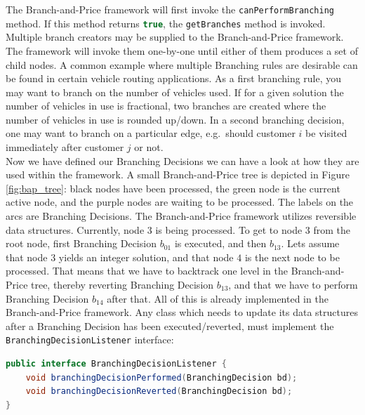 \documentclass[a4paper]{article}
\newenvironment{myblock}[1]{%
    \tcolorbox[beamer,%
    noparskip,breakable,
    colback=lightBlueCodeBlock,colframe=darkBlueCodeBlock,%
    colbacklower=darkBlueCodeBlock!75!lightBlueCodeBlock,%
    coltitle=blueTitleCodeBlock,
    title=#1]}%
    {\endtcolorbox}
\newcommand{\code}[1]{\lstinline[language=java, style=seminar]!#1!}
\begin{document}
The Branch-and-Price framework will first invoke the \code{canPerformBranching} method. If this method returns \code{true}, the \code{getBranches} method is invoked. Multiple branch creators may be supplied to the Branch-and-Price framework. The framework will invoke them one-by-one until either of them produces a set of child nodes. A common example where multiple Branching rules are desirable can be found in certain vehicle routing applications. As a first branching rule, you may want to branch on the number of vehicles used. If for a given solution the number of vehicles in use is fractional, two branches are created where the number of vehicles in use is rounded up/down. In a second branching decision, one may want to branch on a particular edge, e.g.\ should customer $i$ be visited immediately after customer $j$ or not.\\
Now we have defined our Branching Decisions we can have a look at how they are used within the framework. A small Branch-and-Price tree is depicted in Figure \ref{fig:bap_tree}: black nodes have been processed, the green node is the current active node, and the purple nodes are waiting to be processed. The labels on the arcs are Branching Decisions. The Branch-and-Price framework utilizes reversible data structures. Currently, node $3$ is being processed. To get to node $3$ from the root node, first Branching Decision $b_{01}$ is executed, and then $b_{13}$. Lets assume that node $3$ yields an integer solution, and that node $4$ is the next node to be processed. That means that we have to backtrack one level in the Branch-and-Price tree, thereby reverting Branching Decision $b_{13}$, and that we have to perform Branching Decision $b_{14}$ after that. All of this is already implemented in the Branch-and-Price framework. Any class which needs to update its data structures after a Branching Decision has been executed/reverted, must implement the \code{BranchingDecisionListener} interface:
\begin{myblock}{BranchingDecisionListener}
\begin{lstlisting}[language=java, style=eclipseArticle, xleftmargin=2em]  
public interface BranchingDecisionListener {
    void branchingDecisionPerformed(BranchingDecision bd);
    void branchingDecisionReverted(BranchingDecision bd);
}
\end{lstlisting}
\end{myblock}
\end{document}
